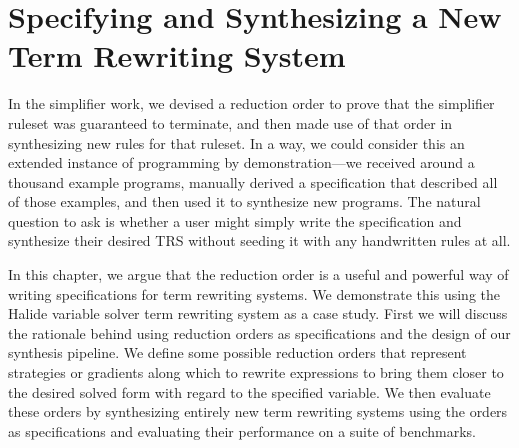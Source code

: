 \chapter{Specifying and Synthesizing a New Term Rewriting System}
\label{chapter:synthfromscratch}

In the simplifier work, we devised a reduction order to prove that the simplifier ruleset was guaranteed to terminate, and then made use of that order in synthesizing new rules for that ruleset. In a way, we could consider this an extended instance of programming by demonstration---we received around a thousand example programs, manually derived a specification that described all of those examples, and then used it to synthesize new programs. The natural question to ask is whether a user might simply write the specification and synthesize their desired TRS without seeding it with any handwritten rules at all.

In this chapter, we argue that the reduction order is a useful and powerful way of writing specifications for term rewriting systems. We demonstrate this using the Halide variable solver term rewriting system as a case study. First we will discuss the rationale behind using reduction orders as specifications and the design of our synthesis pipeline. We define some possible reduction orders that represent strategies or gradients along which to rewrite expressions to bring them closer to the desired solved form with regard to the specified variable. We then evaluate these orders by synthesizing entirely new term rewriting systems using the orders as specifications and evaluating their performance on a suite of benchmarks.

\begin{figure}
\end{figure}


